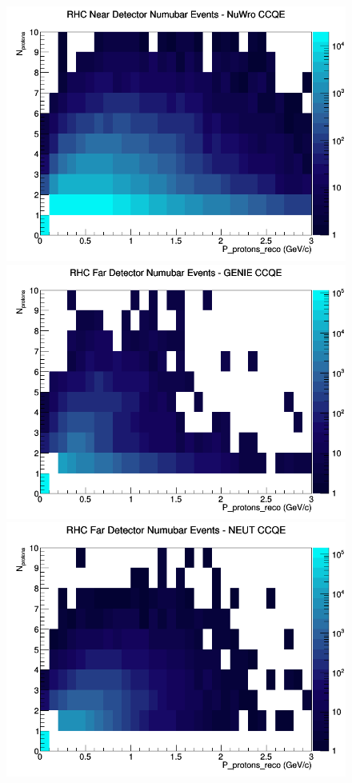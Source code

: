 \begin{figure}[h]
\includegraphics[width=\linewidth]{eff_N_P/GAr/protons/CCQE_RHC_ND_numubar_N_P_NuWro.png}
\endminipage
\newline
{}
\includegraphics[width=\linewidth]{eff_N_P/GAr/protons/CCQE_RHC_FD_numubar_N_P_GENIE.png}
\endminipage
{}
\includegraphics[width=\linewidth]{eff_N_P/GAr/protons/CCQE_RHC_FD_numubar_N_P_NEUT.png}

\end{figure}
